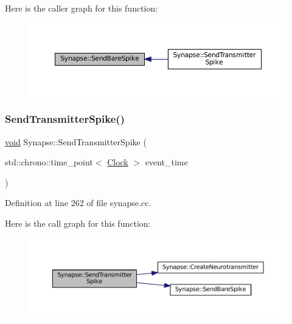 Here is the caller graph for this function\+:\nopagebreak
\begin{figure}[H]
\begin{center}
\leavevmode
\includegraphics[width=350pt]{class_synapse_a0e28e56ecea170443fdd9722622da6b9_icgraph}
\end{center}
\end{figure}
\mbox{\label{class_synapse_a4147d3bea8f21918f88bea334f9c4abc}} 
\subsubsection{\texorpdfstring{Send\+Transmitter\+Spike()}{SendTransmitterSpike()}}
{\footnotesize\ttfamily \mbox{\hyperlink{glad_8h_a950fc91edb4504f62f1c577bf4727c29}{void}} Synapse\+::\+Send\+Transmitter\+Spike (\begin{DoxyParamCaption}\item[{std\+::chrono\+::time\+\_\+point$<$ \mbox{\hyperlink{universe_8h_a0ef8d951d1ca5ab3cfaf7ab4c7a6fd80}{Clock}} $>$}]{event\+\_\+time }\end{DoxyParamCaption})}



Definition at line 262 of file synapse.\+cc.

Here is the call graph for this function\+:\nopagebreak
\begin{figure}[H]
\begin{center}
\leavevmode
\includegraphics[width=350pt]{class_synapse_a4147d3bea8f21918f88bea334f9c4abc_cgraph}
\end{center}
\end{figure}
\mbox{\label{class_synapse_a87fb31c2758d8fc26e8f2cf4fd7d1af5}} 
